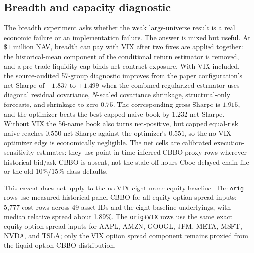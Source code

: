 \subsection{Breadth and capacity diagnostic}

The breadth experiment asks whether the weak large-universe result is a real economic
failure or an implementation failure. The answer is mixed but useful. At \(\$1\) million
NAV, breadth can pay with VIX after two fixes are applied together: the historical-mean
component of the conditional return estimator is removed, and a pre-trade liquidity cap
binds net contract exposure. With VIX included, the source-audited 57-group diagnostic
improves from the paper configuration's net Sharpe of \(-1.837\) to \(+1.499\) when the
combined regularized estimator uses diagonal residual covariance, \(N\)-scaled covariance
shrinkage, structural-only forecasts, and shrinkage-to-zero \(0.75\). The corresponding
gross Sharpe is \(1.915\), and the optimizer beats the best capped-naive book by \(1.232\)
net Sharpe. Without VIX the 56-name book also turns net-positive, but capped equal-risk
naive reaches \(0.550\) net Sharpe against the optimizer's \(0.551\), so the no-VIX
optimizer edge is economically negligible. The net cells are calibrated
execution-sensitivity estimates: they use point-in-time inferred CBBO proxy rows wherever
historical bid/ask CBBO is absent, not the stale off-hours Cboe delayed-chain file or the
old 10\%/15\% class defaults.

This caveat does not apply to the no-VIX eight-name equity baseline. The \texttt{orig}
rows use measured historical panel CBBO for all equity-option spread inputs: 5,777 cost
rows across 49 asset IDs and the eight baseline underlyings, with median relative spread
about 1.89\%. The \texttt{orig+VIX} rows use the same exact equity-option spread inputs
for AAPL, AMZN, GOOGL, JPM, META, MSFT, NVDA, and TSLA; only the VIX option spread
component remains proxied from the liquid-option CBBO distribution.

